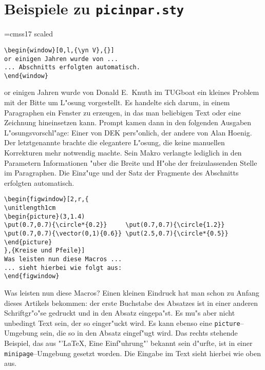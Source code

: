 \setlength{\parskip}{.66\baselineskip}
\setlength{\parindent}{0pt}

\section*{Beispiele zu {\tt picinpar.sty}}
\font\yn=cmss17 scaled  %
\begin{verbatim}
\begin{window}[0,l,{\yn V},{}]
or einigen Jahren wurde von ...
... Abschnitts erfolgten automatisch.
\end{window}
\end{verbatim}

\begin{window}[0,l,{\yn V},{}]
or einigen Jahren wurde von Donald E.~Knuth im TUGboat ein kleines
Problem mit der Bitte um L"osung vorgestellt. Es handelte sich darum,
in einem Paragraphen ein Fenster zu erzeugen, in das man beliebigen Text
oder eine Zeichnung hineinsetzen kann. Prompt kamen dann in den folgenden
Ausgaben L"osungsvorschl"age: Einer von DEK pers"onlich, der andere von
Alan Hoenig. Der letztgenannte brachte die elegantere L"osung, die keine
manuellen Korrekturen mehr notwendig machte. Sein Makro verlangte lediglich
in den Parametern Informationen "uber die Breite und H"ohe der
freizulassenden Stelle im Paragraphen. Die Einz"uge und der Satz der
Fragmente des Abschnitts erfolgten automatisch.
\end{window}

\begin{verbatim}
\begin{figwindow}[2,r,{
\unitlength1cm
\begin{picture}(3,1.4)
\put(0.7,0.7){\circle*{0.2}}     \put(0.7,0.7){\circle{1.2}}
\put(0.7,0.7){\vector(0,1){0.6}} \put(2.5,0.7){\circle*{0.5}}
\end{picture}
},{Kreise und Pfeile}]
Was leisten nun diese Macros ...
... sieht hierbei wie folgt aus:
\end{figwindow}
\end{verbatim}

\begin{figwindow}
Was leisten nun diese Macros? Einen kleinen Eindruck hat man schon
zu Anfang dieses Artikels bekommen: der erste Buchstabe des Absatzes
ist in einer anderen Schriftgr"o"se gedruckt und in den Absatz eingepa"st.
Es mu"s aber nicht unbedingt Text sein, der so einger"uckt wird. Es kann
ebenso eine \verb?picture?--Umgebung sein, die so in den Absatz eingef"ugt
wird. Das rechts stehende Beispiel, das aus "'\LaTeX , Eine Einf"uhrung"'
bekannt sein d"urfte, ist in einer \verb?minipage?--Umgebung gesetzt
worden. Die Eingabe im Text sieht hierbei wie oben aus.
\end{figwindow}

